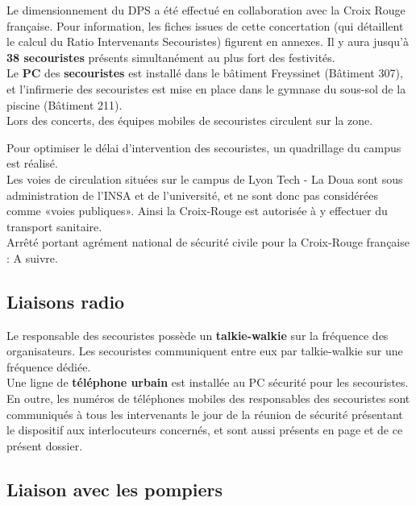 \documentclass[hidelinks, paper=a4, fontsize=13pt]{report}
\begin{document}
Le dimensionnement du DPS a été effectué en collaboration avec la Croix Rouge française. Pour information, les fiches issues de cette concertation (qui détaillent le calcul du Ratio Intervenants Secouristes) figurent en annexes. Il y aura jusqu’à \textbf{38 secouristes} présents simultanément au plus fort des festivités.\\

Le \textbf{PC} des \textbf{secouristes} est installé dans le bâtiment Freyssinet (Bâtiment 307), et l’infirmerie des secouristes est mise en place dans le gymnase du sous-sol de la piscine (Bâtiment 211). \\
Lors des concerts, des équipes mobiles de secouristes circulent sur la zone.

Pour optimiser le délai d’intervention des secouristes, un quadrillage du campus est réalisé.\\

Les voies de circulation situées sur le campus de Lyon Tech - La Doua sont sous administration de l’INSA et de l’université, et ne sont donc pas considérées comme «voies publiques». Ainsi la Croix-Rouge est autorisée à y effectuer du transport sanitaire.\\


Arrêté portant agrément national de sécurité civile pour la Croix-Rouge française : A suivre.


\subsection{Liaisons radio}


Le responsable des secouristes possède un \textbf{talkie-walkie} sur la fréquence des organisateurs. Les secouristes communiquent entre eux par talkie-walkie sur une fréquence dédiée.\\

Une ligne de \textbf{téléphone urbain} est installée au PC sécurité pour les secouristes.\\

En outre, les numéros de téléphones mobiles des responsables des secouristes sont communiqués à tous les intervenants le jour de la réunion de sécurité présentant le dispositif aux interlocuteurs concernés, et sont aussi présents en page \pageref{refTelPC} et \pageref{refTelOrgas} de ce présent dossier.

\subsection{Liaison avec les pompiers}
\end{document}

